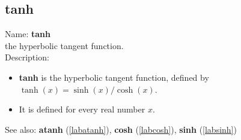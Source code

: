 \subsection{tanh}
\label{labtanh}
\noindent Name: \textbf{tanh}\\
the hyperbolic tangent function.\\
\noindent Description: \begin{itemize}

\item \textbf{tanh} is the hyperbolic tangent function, defined by $\tanh(x) = \sinh(x)/\cosh(x)$.

\item It is defined for every real number $x$.
\end{itemize}
See also: \textbf{atanh} (\ref{labatanh}), \textbf{cosh} (\ref{labcosh}), \textbf{sinh} (\ref{labsinh})
